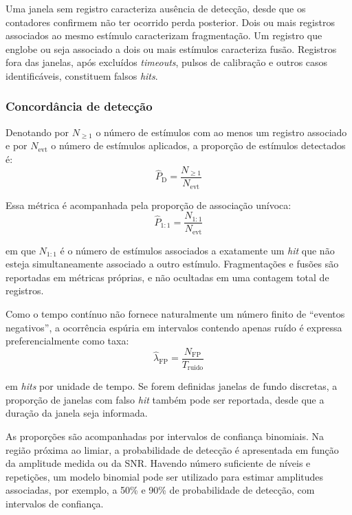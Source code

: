 Uma janela sem registro caracteriza ausência de detecção, desde que os contadores confirmem não ter ocorrido perda posterior. Dois ou mais registros associados ao mesmo estímulo caracterizam fragmentação. Um registro que englobe ou seja associado a dois ou mais estímulos caracteriza fusão. Registros fora das janelas, após excluídos \textit{timeouts}, pulsos de calibração e outros casos identificáveis, constituem falsos \textit{hits}.

\subsubsection{Concordância de detecção}
Denotando por \(N_{\geq 1}\) o número de estímulos com ao menos um registro associado e por \(N_{\mathrm{evt}}\) o número de estímulos aplicados, a proporção de estímulos detectados é:
\begin{equation}
	\widehat{P}_{\mathrm{D}} = \frac{N_{\geq 1}}{N_{\mathrm{evt}}}
	\label{v2:eq:probabilidade_deteccao}
\end{equation}

Essa métrica é acompanhada pela proporção de associação unívoca:
\begin{equation}
	\widehat{P}_{1:1} = \frac{N_{1:1}}{N_{\mathrm{evt}}}
	\label{v2:eq:proporcao_associacao_univoca}
\end{equation}

\noindent
em que \(N_{1:1}\) é o número de estímulos associados a exatamente um \textit{hit} que não esteja simultaneamente associado a outro estímulo. Fragmentações e fusões são reportadas em métricas próprias, e não ocultadas em uma contagem total de registros.

Como o tempo contínuo não fornece naturalmente um número finito de ``eventos negativos'', a ocorrência espúria em intervalos contendo apenas ruído é expressa preferencialmente como taxa:
\begin{equation}
	\widehat{\lambda}_{\mathrm{FP}} = \frac{N_{\mathrm{FP}}}{T_{\mathrm{ruido}}}
	\label{v2:eq:taxa_falsos_hits}
\end{equation}

\noindent
em \textit{hits} por unidade de tempo. Se forem definidas janelas de fundo discretas, a proporção de janelas com falso \textit{hit} também pode ser reportada, desde que a duração da janela seja informada.

As proporções são acompanhadas por intervalos de confiança binomiais. Na região próxima ao limiar, a probabilidade de detecção é apresentada em função da amplitude medida ou da SNR. Havendo número suficiente de níveis e repetições, um modelo binomial pode ser utilizado para estimar amplitudes associadas, por exemplo, a 50\% e 90\% de probabilidade de detecção, com intervalos de confiança.

